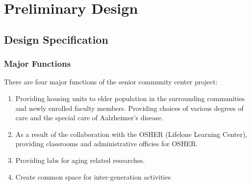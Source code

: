 
\chapter{Preliminary Design} %

\label{Chapter3} %


\section{Design Specification}
\subsection{Major Functions}
There are four major functions of the senior community center project:
\begin{enumerate}
\item Providing housing units to elder population in the surrounding
  communities and newly enrolled faculty members. Providing choices of 
  various degrees of care and the special care of Aalzheimer's
  disease. 
\item As a result of the collaboration with the OSHER (Lifelone
  Learning Center), providing classrooms and administrative officies
  for OSHER. 
\item Providing labs for aging related researches.
\item Create common space for inter-generation activities
\end{enumerate}

\clearpage
